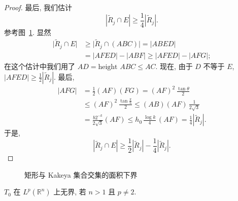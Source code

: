 \begin{proof}
最后, 我们估计
\[
|\tilde{R}_{j}\cap E|\geq\frac{1}{4}|\tilde{R}_{j}|.
\]
参考图~\ref{fig:11}. 显然
\begin{align*}
\bigl|\tilde{R}_{j}\cap E\bigr|&\geq\bigl|\tilde{R}_{j}\cap(ABC)\bigr|=\bigl|ABED\bigr| \\
&=\bigl|AFED\bigr|-\bigl|ABF\bigr|\geq\bigl|AFED\bigr|-\bigl|AFG\bigr|;
\end{align*}
在这个估计中我们用了 $AD=\text{height }ABC\leq AC$. 现在, 由于 $D$ 不等于 $E$, $|AFED|\geq\frac{1}{2}|\tilde{R}_j|$. 最后,
\begin{align*}
|AFG|&=\frac{1}{2}(AF)(FG)=(AF)^{2}\,\frac{\tan\theta}{2} \\
&\leq(AF)^{2}\,\frac{\tan\frac{\pi}{6}}{2}
\leq(AB)(AF)\,\frac{1}{2\sqrt{3}} \\
&=\frac{b2^{-k}}{2\sqrt{3}}(AF)\leq h_{0}\,\frac{\log k}{4}\,(AF)=\frac{1}{4}|\tilde{R}_{j}|.
\end{align*}
于是,
\[
|\tilde{R}_{j}\cap E|\geq\frac{1}{2}|\tilde{R}_{j}|-\frac{1}{4}|\tilde{R}_{j}|.
\]
\end{proof}

\begin{figure}[htbp]
\centering
{}
\caption{矩形与 Kakeya 集合交集的面积下界}
\label{fig:11}
\end{figure}

\begin{theorem}\label{thm:7.5}
$T_0$ 在 $L^p(\mathbb{R}^n)$ 上无界, 若 $n>1$ 且 $p\neq 2$.
\end{theorem}

